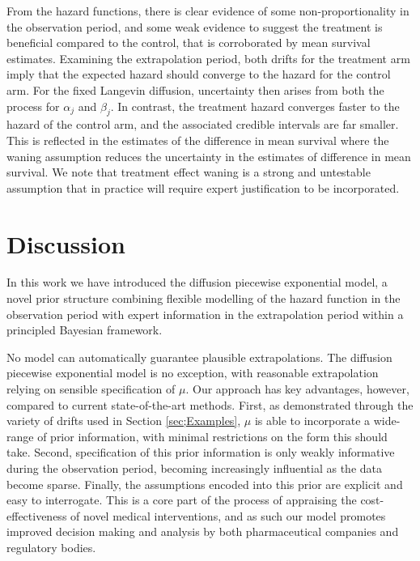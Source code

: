 \documentclass[ba,preprint]{imsart}
\theoremstyle{plain}
\theoremstyle{definition}
\theoremstyle{remark}
\begin{document}
From the hazard functions, there is clear evidence of some non-proportionality in the observation period, and some weak evidence to suggest the treatment is beneficial compared to the control, that is corroborated by mean survival estimates. Examining the extrapolation period, both drifts for the treatment arm imply that the expected hazard should converge to the hazard for the control arm. For the fixed Langevin diffusion, uncertainty then arises from both the process for $\alpha_j$ and $\beta_j$. In contrast, the treatment hazard converges faster to the hazard of the control arm, and the associated credible intervals are far smaller. This is reflected in the estimates of the difference in mean survival where the waning assumption reduces the uncertainty in the estimates of difference in mean survival. We note that treatment effect waning is a strong and untestable assumption that in practice will require expert justification to be incorporated. 

\section{Discussion}
\label{sec;Discussion}
In this work we have introduced the diffusion piecewise exponential model, a novel prior structure combining flexible modelling of the hazard function in the observation period with expert information in the extrapolation period within a principled Bayesian framework.

No model can automatically guarantee plausible extrapolations. The diffusion piecewise exponential model is no exception, with reasonable extrapolation relying on sensible specification of $\mu$. Our approach has key advantages, however, compared to current state-of-the-art methods. First, as demonstrated through the variety of drifts used in Section \ref{sec;Examples}, $\mu$ is able to incorporate a wide-range of prior information, with minimal restrictions on the form this should take. Second, specification of this prior information is only weakly informative during the observation period, becoming increasingly influential as the data become sparse. Finally, the assumptions encoded into this prior are explicit and easy to interrogate. This is a core part of the process of appraising the cost-effectiveness of novel medical interventions, and as such our model promotes improved decision making and analysis by both pharmaceutical companies and regulatory bodies. 
\end{document}
